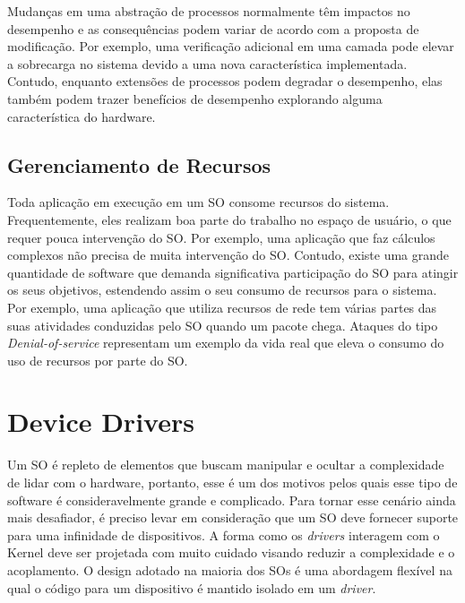 Mudanças em uma abstração de processos normalmente têm impactos no desempenho e
as consequências podem variar de acordo com a proposta de modificação. Por
exemplo, uma verificação adicional em uma camada pode elevar a sobrecarga no
sistema devido a uma nova característica implementada. Contudo, enquanto
extensões de processos podem degradar o desempenho, elas também podem trazer
benefícios de desempenho explorando alguma característica do hardware.

\subsection{Gerenciamento de Recursos}

Toda aplicação em execução em um SO consome recursos do sistema.
Frequentemente, eles realizam boa parte do trabalho no espaço de usuário, o que
requer pouca intervenção do SO. Por exemplo, uma aplicação que faz cálculos
complexos não precisa de muita intervenção do SO. Contudo, existe uma grande
quantidade de software que demanda significativa participação do SO para
atingir os seus objetivos, estendendo assim o seu consumo de recursos para o
sistema. Por exemplo, uma aplicação que utiliza recursos de rede tem várias
partes das suas atividades conduzidas pelo SO quando um pacote chega.  Ataques do tipo
\emph{Denial-of-service} representam um exemplo da vida real que eleva o
consumo do uso de recursos por parte do SO.


\section{Device Drivers}
\label{sec:dd}

Um SO é repleto de elementos que buscam manipular e ocultar a complexidade de
lidar com o hardware, portanto, esse é um dos motivos pelos quais esse tipo de
software é consideravelmente grande e complicado. Para tornar esse cenário
ainda mais desafiador, é preciso levar em consideração que um SO deve fornecer
suporte para uma infinidade de dispositivos. A forma como os \emph{drivers}
interagem com o Kernel deve ser projetada com muito cuidado visando reduzir a
complexidade e o acoplamento. O design adotado na maioria dos SOs é uma
abordagem flexível na qual o código para um dispositivo é mantido isolado em um
\emph{driver}.

